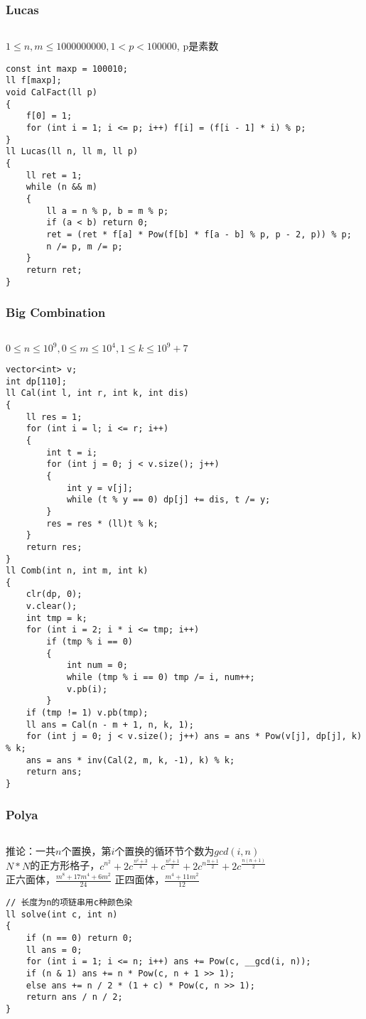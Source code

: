 \documentclass[twoside]{article}
\begin{document}
\subsubsection{Lucas}
\begin{lstlisting}
\end{lstlisting}
$1 \leq n, m \leq 1000000000, 1 < p < 100000$, p是素数
\begin{lstlisting}
const int maxp = 100010;
ll f[maxp];
void CalFact(ll p)
{
    f[0] = 1;
    for (int i = 1; i <= p; i++) f[i] = (f[i - 1] * i) % p;
}
ll Lucas(ll n, ll m, ll p)
{
    ll ret = 1;
    while (n && m)
    {
        ll a = n % p, b = m % p;
        if (a < b) return 0;
        ret = (ret * f[a] * Pow(f[b] * f[a - b] % p, p - 2, p)) % p;
        n /= p, m /= p;
    }
    return ret;
}
\end{lstlisting}
\subsubsection{Big Combination}
\begin{lstlisting}
\end{lstlisting}
$0 \leq n \leq 10^9, 0 \leq m \leq 10^4, 1 \leq k \leq 10^9+7$
\begin{lstlisting}
vector<int> v;
int dp[110];
ll Cal(int l, int r, int k, int dis)
{
    ll res = 1;
    for (int i = l; i <= r; i++)
    {
        int t = i;
        for (int j = 0; j < v.size(); j++)
        {
            int y = v[j];
            while (t % y == 0) dp[j] += dis, t /= y;
        }
        res = res * (ll)t % k;
    }
    return res;
}
ll Comb(int n, int m, int k)
{
    clr(dp, 0);
    v.clear();
    int tmp = k;
    for (int i = 2; i * i <= tmp; i++)
        if (tmp % i == 0)
        {
            int num = 0;
            while (tmp % i == 0) tmp /= i, num++;
            v.pb(i);
        }
    if (tmp != 1) v.pb(tmp);
    ll ans = Cal(n - m + 1, n, k, 1);
    for (int j = 0; j < v.size(); j++) ans = ans * Pow(v[j], dp[j], k) % k;
    ans = ans * inv(Cal(2, m, k, -1), k) % k;
    return ans;
}
\end{lstlisting}
\subsubsection{Polya}
\begin{lstlisting}
\end{lstlisting}
推论：一共$n$个置换，第$i$个置换的循环节个数为$gcd(i,n)$\\
$N*N$的正方形格子，$c^{n^2}+2c^{\frac{n^2+3}{4}}+c^{\frac{n^2+1}{2}}+2c^{n\frac{n+1}{2}}+2c^{\frac{n(n+1)}{2}}$\\
正六面体，$\frac{m^8+17m^4+6m^2}{24}$
正四面体，$\frac{m^4+11m^2}{12}$\\
\begin{lstlisting}
// 长度为n的项链串用c种颜色染
ll solve(int c, int n)
{
    if (n == 0) return 0;
    ll ans = 0;
    for (int i = 1; i <= n; i++) ans += Pow(c, __gcd(i, n));
    if (n & 1) ans += n * Pow(c, n + 1 >> 1);
    else ans += n / 2 * (1 + c) * Pow(c, n >> 1);
    return ans / n / 2;
}
\end{lstlisting}
\end{document}
